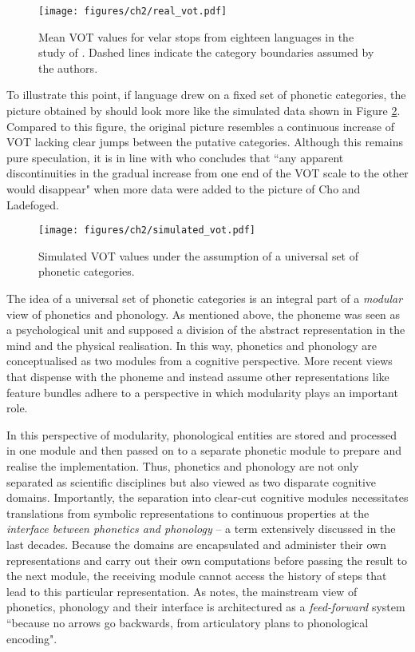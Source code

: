 \begin{figure}
\texttt{[image: figures/ch2/real\_vot.pdf]}
\caption[Mean VOT values for velar stops from eighteen languages in the study of \cite{ChoLadefoged1999}]{Mean VOT values for velar stops from eighteen languages in the study of \cite{ChoLadefoged1999}. Dashed lines indicate the category boundaries assumed by the authors.}
\label{fig:cho_ladefoged_1999}
\end{figure}

To illustrate this point, if language drew on a fixed set of phonetic categories, the picture obtained by \cite{ChoLadefoged1999} should look more like the simulated data shown in Figure \ref{fig:simulated_vot}. Compared to this figure, the original picture resembles a continuous increase of VOT lacking clear jumps between the putative categories. Although this remains pure speculation, it is in line with \citet[42]{Ladd2014} who concludes that ``any apparent discontinuities in the gradual increase from one end of the VOT scale to the other would disappear" when more data were added to the picture of Cho and Ladefoged.

\begin{figure}
\texttt{[image: figures/ch2/simulated\_vot.pdf]}
\caption{Simulated VOT values under the assumption of a universal set of phonetic categories.}
\label{fig:simulated_vot}
\end{figure}

The idea of a universal set of phonetic categories is an integral part of a \emph{modular} view of phonetics and phonology. As mentioned above, the phoneme was seen as a psychological unit and supposed a division of the abstract representation in the mind and the physical realisation. In this way, phonetics and phonology are conceptualised as two modules from a cognitive perspective. More recent views that dispense with the phoneme and instead assume other representations like feature bundles adhere to a perspective in which modularity plays an important role.

In this perspective of modularity, phonological entities are stored and processed in one module and then passed on to a separate phonetic module to prepare and realise the implementation. Thus, phonetics and phonology are not only separated as scientific disciplines but also viewed as two disparate cognitive domains. Importantly, the separation into clear-cut cognitive modules necessitates translations from symbolic representations to continuous properties \citep{Ohala1990,GafosBenus2006} at the \emph{interface between phonetics and phonology} \citep{Keating1988} -- a term extensively discussed in the last decades. Because the domains are encapsulated and administer their own representations and carry out their own computations before passing the result to the next module, the receiving module cannot access the history of steps that lead to this particular representation. As  \citet[102]{Pierrehumbert2002} notes, the mainstream view of phonetics, phonology and their interface is architectured as a \emph{feed-forward} system ``because no arrows go backwards, from articulatory plans to phonological encoding".

